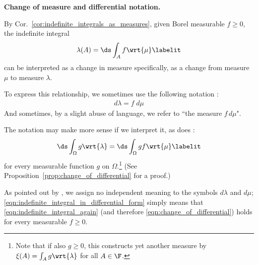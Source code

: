\documentclass{article} %
\newcommand{\dint}{\ds\int}
\newcommand{\dmu}{\wrt{\mu}}
\begin{document}
\begin{remark}{\textbf{Change of measure and differential notation.}}

 By Cor.~\ref{cor:indefinite_integrals_as_measures},  given Borel measurable $f \geq 0$, the indefinite integral 
%
\begin{align*}
\lambda(A)  =  \ds\int_A f \dmu
\labelit \label{eqn:indefinite_integral_again}
\end{align*}
 can be interpreted as a change in measure specifically, as a change from measure $\mu$ to measure $\lambda$. 
 
To express this relationship, we sometimes use the following notation \cite[pp.~89]{folland1999real}:
%
\begin{align} 
d\lambda = f \; d\mu 
\label{eqn:indefinite_integral_in_differential_form}	
\end{align}
%
And sometimes, by a slight abuse of language, we refer to ``the measure $f \, d\mu$".

The notation may make more sense if we interpret it, as does \cite[pp.~24]{rudin1987real}:
\begin{align*}
\dint_\Omega g \wrt{\lambda} = \dint_\Omega g f \dmu
\labelit \label{eqn:change_of_differential}
\end{align*}
for every measurable function $g$ on $\Omega$.\footnote{Note that if also $g \geq 0$, this constructs yet another measure by $\xi(A) = \int_A g \wrt{\lambda}$ for all $A \in \F$.} (See  Proposition~\ref{prop:change_of_differential} for a proof.) 


As pointed out by \cite[pp.~24]{rudin1987real}, we assign no independent meaning to the symbols 
$d\lambda$ and $d\mu$; \eqref{eqn:indefinite_integral_in_differential_form} simply means that \eqref{eqn:indefinite_integral_again} (and therefore \eqref{eqn:change_of_differential}) holds for every measurable $f \geq 0$. 

\label{rk:change_of_measure_and_differential_notation}
\end{remark}
\end{document}

